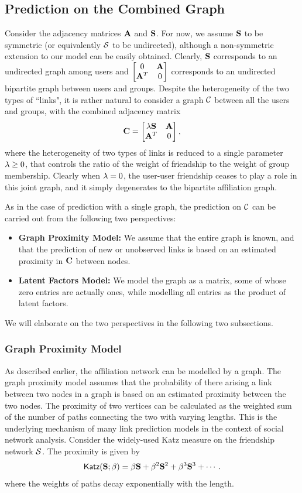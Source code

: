 \documentclass{sig-alternate}
\begin{document}
\subsection{Prediction on the Combined Graph}
Consider the adjacency matrices $\mathbf{A}$ and $\mathbf{S}$. For now, we assume $\mathbf{S}$ to be symmetric (or equivalently $\mathcal{S}$ to be undirected), although a non-symmetric extension to our model can be easily obtained. Clearly, $\mathbf{S}$ corresponds to an undirected graph among users and $\begin{bmatrix}
 0 & \mathbf{A} \\
\mathbf{A}^T & 0
\end{bmatrix}$
corresponds to an undirected bipartite graph between users and groups. Despite the heterogeneity of the two types of ``links", it is rather natural to consider a graph $\mathcal{C}$ between all the users and groups, with the combined adjacency matrix
\[\mathbf{C} =
\begin{bmatrix}
\lambda \mathbf{S} & \mathbf{A} \\
\mathbf{A}^T & 0
\end{bmatrix},
\label{e:C}
\]
where the heterogeneity of two types of links is reduced to a single parameter $\lambda \geq 0$, that controls the ratio of the weight of friendship to the weight of group membership. Clearly when $\lambda = 0$, the user-user friendship ceases to play a role in this joint graph, and it simply degenerates to the bipartite affiliation graph.

As in the case of prediction with a single graph, the prediction on $\mathcal{C}$ can be carried out from the following two perspectives:
\begin{itemize}
\item {\bf Graph Proximity Model:} We assume that the entire graph is known, and that the prediction of new or unobserved links is based on an estimated proximity in $\mathbf{C}$ between nodes.
\item {\bf Latent Factors Model:} We model the graph as a matrix, some of whose zero entries are actually ones, while modelling all entries as the product of latent factors.
\end{itemize}
We will elaborate on the two perspectives in the following two subsections.

\subsubsection{Graph Proximity Model}
\label{Graph Proximity Model}
As described earlier, the affiliation network can be modelled by a graph. The graph proximity model assumes that the probability of there arising a link between two nodes in a graph is based on an estimated proximity between the two nodes. The proximity of two vertices can be calculated as the weighted sum of the number of paths connecting the two with varying lengths. This is the underlying mechanism of many link prediction models in the context of social network analysis. Consider the widely-used \textsf{Katz} measure\cite{KleinbergLinkPred} on the friendship network $\mathcal{S}$. The proximity is given by
\[
\textsf{Katz}(\mathbf{S}; \beta) = \beta \mathbf{S} + \beta^2 \mathbf{S}^2 + \beta^3 \mathbf{S}^3 + \cdots.
\]
where the weights of paths decay exponentially with the length.
\end{document}
